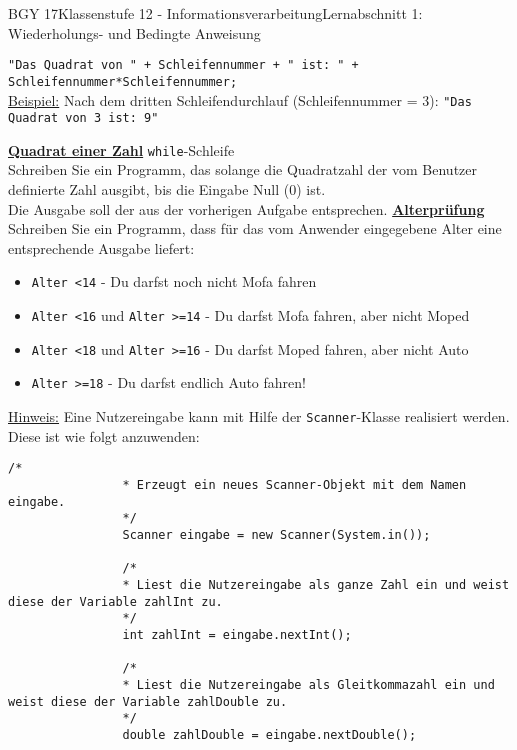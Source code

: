 \documentclass[oneside,openany,headings=optiontotoc,11pt,numbers=noenddot]{scrreprt}
\begin{document}
\begin{worksheet}{BGY 17}{Klassenstufe 12 - Informationsverarbeitung}{Lernabschnitt 1: Wiederholungs- und Bedingte Anweisung}
\begin{framed}
			\lstinline[style=JavaInputStyle]{"Das Quadrat von " + Schleifennummer + " ist: " + Schleifennummer*Schleifennummer;}\\
			\underline{Beispiel:} Nach dem dritten Schleifendurchlauf (Schleifennummer = 3): \lstinline[style=JavaInputStyle]{"Das Quadrat von 3 ist: 9"}
			\par\bigskip\noindent
			\textbf{\underline{Quadrat einer Zahl}} \lstinline[style=JavaInputStyle]{while}-Schleife\\
			Schreiben Sie ein Programm, das solange die Quadratzahl der vom Benutzer definierte Zahl ausgibt, bis die Eingabe Null (0) ist.\\
			Die Ausgabe soll der aus der vorherigen Aufgabe entsprechen.
			\newpage
			\noindent
			\textbf{\underline{Alterprüfung}}\\
			Schreiben Sie ein Programm, dass für das vom Anwender eingegebene Alter eine entsprechende Ausgabe liefert:
			\begin{itemize}
				\item \lstinline[style=JavaInputStyle]{Alter <14} - \grqq{}Du darfst noch nicht Mofa fahren\grqq{}
				\item \lstinline[style=JavaInputStyle]{Alter <16} und \lstinline[style=JavaInputStyle]{Alter >=14} - \grqq{}Du darfst Mofa fahren, aber nicht Moped\grqq{}
				\item \lstinline[style=JavaInputStyle]{Alter <18} und \lstinline[style=JavaInputStyle]{Alter >=16} - \grqq{}Du darfst Moped fahren, aber nicht Auto\grqq{}
				\item \lstinline[style=JavaInputStyle]{Alter >=18} - \grqq{}Du darfst endlich Auto fahren!\grqq{}
			\end{itemize}
			\par\bigskip\noindent
			\underline{Hinweis:} Eine Nutzereingabe kann mit Hilfe der \lstinline[style=JavaInputStyle]{Scanner}-Klasse realisiert werden. Diese ist wie folgt anzuwenden:
			\begin{lstlisting}[style=JavaInputStyle]
				/*
				* Erzeugt ein neues Scanner-Objekt mit dem Namen eingabe.
				*/
				Scanner eingabe = new Scanner(System.in());
				
				/*
				* Liest die Nutzereingabe als ganze Zahl ein und weist diese der Variable zahlInt zu.
				*/
				int zahlInt = eingabe.nextInt();
				
				/*
				* Liest die Nutzereingabe als Gleitkommazahl ein und weist diese der Variable zahlDouble zu.
				*/
				double zahlDouble = eingabe.nextDouble();
			\end{lstlisting}
		\end{framed}
	\end{worksheet}
\end{document}
